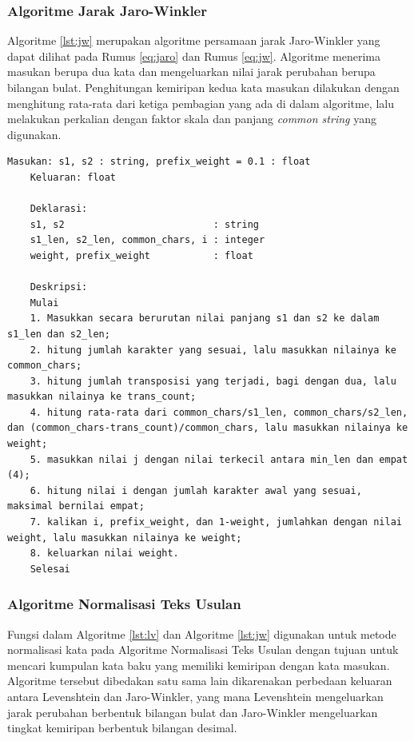 \subsubsection{Algoritme Jarak Jaro-Winkler}

Algoritme \ref{lst:jw} \parencite{orsiniumtext} merupakan algoritme persamaan jarak Jaro-Winkler yang dapat dilihat pada Rumus \ref{eq:jaro} dan Rumus \ref{eq:jw}. Algoritme menerima masukan berupa dua kata dan mengeluarkan nilai jarak perubahan berupa bilangan bulat. Penghitungan kemiripan kedua kata masukan dilakukan dengan menghitung rata-rata dari ketiga pembagian yang ada di dalam algoritme, lalu melakukan perkalian dengan faktor skala dan panjang \textit{common string} yang digunakan.
\begin{lstlisting}[caption={Algoritme Fungsi Jarak Jaro-Winkler \parencite{orsiniumtext}},label={lst:jw},float,floatplacement=H]
	Masukan: s1, s2	: string, prefix_weight = 0.1 : float
	Keluaran: float
	
	Deklarasi:
	s1, s2 							: string
	s1_len, s2_len, common_chars, i	: integer
	weight, prefix_weight			: float
	
	Deskripsi:
	Mulai
	1. Masukkan secara berurutan nilai panjang s1 dan s2 ke dalam s1_len dan s2_len;
	2. hitung jumlah karakter yang sesuai, lalu masukkan nilainya ke common_chars;
	3. hitung jumlah transposisi yang terjadi, bagi dengan dua, lalu masukkan nilainya ke trans_count;
	4. hitung rata-rata dari common_chars/s1_len, common_chars/s2_len, dan (common_chars-trans_count)/common_chars, lalu masukkan nilainya ke weight;
	5. masukkan nilai j dengan nilai terkecil antara min_len dan empat (4);
	6. hitung nilai i dengan jumlah karakter awal yang sesuai, maksimal bernilai empat;
	7. kalikan i, prefix_weight, dan 1-weight, jumlahkan dengan nilai weight, lalu masukkan nilainya ke weight;
	8. keluarkan nilai weight.
	Selesai
\end{lstlisting}

\subsubsection{Algoritme Normalisasi Teks Usulan}

Fungsi dalam Algoritme \ref{lst:lv} dan Algoritme \ref{lst:jw} digunakan untuk metode normalisasi kata pada Algoritme Normalisasi Teks Usulan dengan tujuan untuk mencari kumpulan kata baku yang memiliki kemiripan dengan kata masukan. Algoritme tersebut dibedakan satu sama lain dikarenakan perbedaan keluaran antara Levenshtein dan Jaro-Winkler, yang mana Levenshtein mengeluarkan jarak perubahan berbentuk bilangan bulat dan Jaro-Winkler mengeluarkan tingkat kemiripan berbentuk bilangan desimal.

